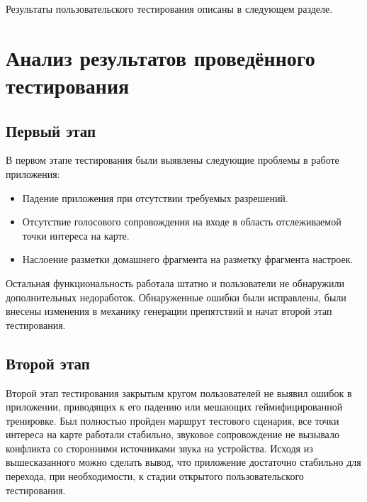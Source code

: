 Результаты пользовательского тестирования описаны в следующем разделе.

\section{Анализ результатов проведённого тестирования}
\subsection*{Первый этап}
В первом этапе тестирования были выявлены следующие проблемы в работе приложения:
\begin{itemize}
	\item Падение приложения при отсутствии требуемых разрешений.
	\item Отсутствие голосового сопровождения на входе в область отслеживаемой точки интереса на карте.
	\item Наслоение разметки домашнего фрагмента на разметку фрагмента настроек.
\end{itemize}
\smallskip
Остальная функциональность работала штатно и пользователи не обнаружили дополнительных недоработок. Обнаруженные ошибки были исправлены, были внесены изменения в механику генерации препятствий и начат второй этап тестирования.

\subsection*{Второй этап}
Второй этап тестирования закрытым кругом пользователей не выявил ошибок в приложении, приводящих к его падению или мешающих геймифицированной тренировке.
Был полностью пройден маршрут тестового сценария, все точки интереса на карте работали стабильно, звуковое сопровождение не вызывало конфликта со сторонними источниками звука на устройства.
Исходя из вышесказанного можно сделать вывод, что приложение достаточно стабильно для перехода, при необходимости, к стадии открытого пользовательского тестирования.